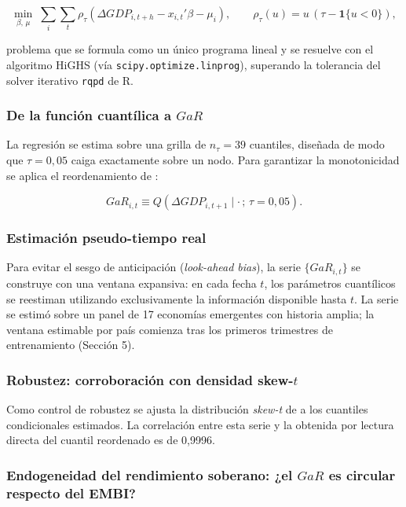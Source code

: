 \[ \min_{\beta,\,\mu}\;\sum_{i}\sum_{t}\rho_\tau\!\left(\Delta GDP_{i,t+h} - x_{i,t}'\beta - \mu_i\right), \qquad \rho_\tau(u) = u\,(\tau - \mathbf{1}\{u<0\}), \]

problema que se formula como un único programa lineal y se resuelve con el algoritmo HiGHS (vía \texttt{scipy.optimize.linprog}), superando la tolerancia del solver iterativo \texttt{rqpd} de R.

\subsubsection{De la función cuantílica a \texorpdfstring{$GaR$}{GaR}}

La regresión se estima sobre una grilla de $n_\tau = 39$ cuantiles, diseñada de modo que $\tau = 0{,}05$ caiga exactamente sobre un nodo. Para garantizar la monotonicidad se aplica el reordenamiento de \citet{ChernozhukovEtAl2010}:

\[ GaR_{i,t} \equiv Q\!\left(\Delta GDP_{i,t+1}\mid \cdot\,;\,\tau = 0{,}05\right). \]

\subsubsection{Estimación pseudo-tiempo real}

Para evitar el sesgo de anticipación (\textit{look-ahead bias}), la serie $\{GaR_{i,t}\}$ se construye con una ventana expansiva: en cada fecha $t$, los parámetros cuantílicos se reestiman utilizando exclusivamente la información disponible hasta $t$. La serie se estimó sobre un panel de 17 economías emergentes con historia amplia; la ventana estimable por país comienza tras los primeros trimestres de entrenamiento (Sección 5).

\subsubsection{Robustez: corroboración con densidad skew-\texorpdfstring{$t$}{t}}

Como control de robustez se ajusta la distribución \textit{skew-t} de \citet{ABG2019b} a los cuantiles condicionales estimados. La correlación entre esta serie y la obtenida por lectura directa del cuantil reordenado es de 0,9996.

\subsubsection{Endogeneidad del rendimiento soberano: ¿el \texorpdfstring{$GaR$}{GaR} es circular respecto del EMBI?}\label{sec:ryr-endogeneidad}

